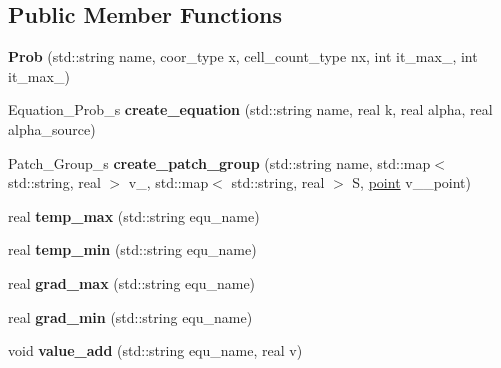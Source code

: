 \subsection*{Public Member Functions}
\begin{DoxyCompactItemize}
\item 
\hypertarget{classProb_a4d146873812b11594835eeb221057ce3}{{\bfseries Prob} (std\+::string name, coor\+\_\+type x, cell\+\_\+count\+\_\+type nx, int it\+\_\+max\+\_, int it\+\_\+max\+\_)}\label{classProb_a4d146873812b11594835eeb221057ce3}

\item 
\hypertarget{classProb_a9e42af858cc616a84ffa860ed30703cc}{Equation\+\_\+\+Prob\+\_\+s {\bfseries create\+\_\+equation} (std\+::string name, real k, real alpha, real alpha\+\_\+source)}\label{classProb_a9e42af858cc616a84ffa860ed30703cc}

\item 
\hypertarget{classProb_abb05f9a8629633d7509ec035128c3012}{Patch\+\_\+\+Group\+\_\+s {\bfseries create\+\_\+patch\+\_\+group} (std\+::string name, std\+::map$<$ std\+::string, real $>$ v\+\_, std\+::map$<$ std\+::string, real $>$ S, \hyperlink{structpoint}{point} v\+\_\+\_\+point)}\label{classProb_abb05f9a8629633d7509ec035128c3012}

\item 
\hypertarget{classProb_a70dca1f3332e57f72b834ba91d52ca31}{real {\bfseries temp\+\_\+max} (std\+::string equ\+\_\+name)}\label{classProb_a70dca1f3332e57f72b834ba91d52ca31}

\item 
\hypertarget{classProb_ac1bce1f293f1ec1c251730db1a1d0313}{real {\bfseries temp\+\_\+min} (std\+::string equ\+\_\+name)}\label{classProb_ac1bce1f293f1ec1c251730db1a1d0313}

\item 
\hypertarget{classProb_a9fff19c6e6676c72153dc0ed32b1e6a9}{real {\bfseries grad\+\_\+max} (std\+::string equ\+\_\+name)}\label{classProb_a9fff19c6e6676c72153dc0ed32b1e6a9}

\item 
\hypertarget{classProb_a6dc764bdb12b430c1a28d73925f6c6d8}{real {\bfseries grad\+\_\+min} (std\+::string equ\+\_\+name)}\label{classProb_a6dc764bdb12b430c1a28d73925f6c6d8}

\item 
\hypertarget{classProb_aa5c8f3a5c0e9a15e054ca37d150a8921}{void {\bfseries value\+\_\+add} (std\+::string equ\+\_\+name, real v)}\label{classProb_aa5c8f3a5c0e9a15e054ca37d150a8921}


\end{DoxyCompactItemize}
